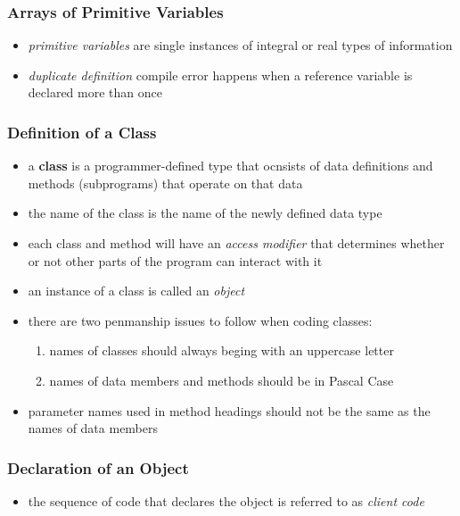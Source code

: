 \documentclass[11pt]{article}
\begin{document}
\subsubsection{Arrays of Primitive Variables}
\label{sec:org7fa9008}
\begin{itemize}
\item \emph{primitive variables} are single instances of integral or real types of information
\item \emph{duplicate definition} compile error happens when a reference variable is declared more than once
\end{itemize}
\subsubsection{Definition of a Class}
\label{sec:org78fdaf5}
\begin{itemize}
\item a \textbf{class} is a programmer-defined type that ocnsists of data definitions and methods (subprograms) that operate on that data
\item the name of the class is the name of the newly defined data type
\item each class and method will have an \emph{access modifier} that determines whether or not other parts of the program can interact with it
\item an instance of a class is called an \emph{object}
\item there are two penmanship issues to follow when coding classes:
\begin{enumerate}
\item names of classes should always beging with an uppercase letter
\item names of data members and methods should be in Pascal Case
\end{enumerate}
\item parameter names used in method headings should not be the same as the names of data members
\end{itemize}
\subsubsection{Declaration of an Object}
\label{sec:org68d4a5a}
\begin{itemize}
\item the sequence of code that declares the object is referred to as \emph{client code}
\end{itemize}
\end{document}
